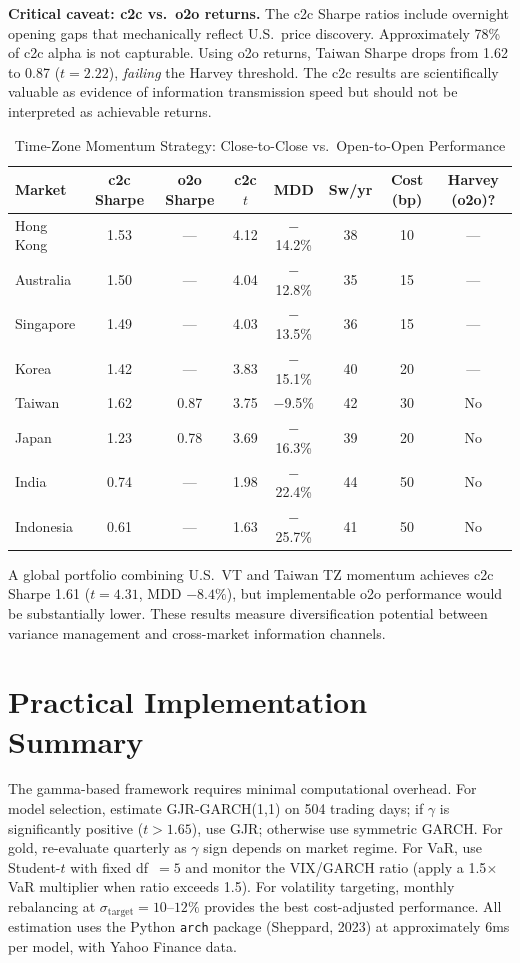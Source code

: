 \textbf{Critical caveat: c2c vs.\ o2o returns.} The c2c Sharpe ratios include overnight opening gaps that mechanically reflect U.S.\ price discovery. Approximately 78\% of c2c alpha is not capturable. Using o2o returns, Taiwan Sharpe drops from 1.62 to 0.87 ($t = 2.22$), \textit{failing} the Harvey threshold. The c2c results are scientifically valuable as evidence of information transmission speed but should not be interpreted as achievable returns.

\begin{table}[H]
\centering
\caption{Time-Zone Momentum Strategy: Close-to-Close vs.\ Open-to-Open Performance}
\label{tab:tz_arbitrage}
\small
\begin{tabular}{lccccccc}
\hline
Market & c2c Sharpe & o2o Sharpe & c2c $t$ & MDD & Sw/yr & Cost (bp) & Harvey (o2o)? \\
\hline
Hong Kong  & 1.53 & --- & 4.12 & $-$14.2\% & 38 & 10 & --- \\
Australia  & 1.50 & --- & 4.04 & $-$12.8\% & 35 & 15 & --- \\
Singapore  & 1.49 & --- & 4.03 & $-$13.5\% & 36 & 15 & --- \\
Korea      & 1.42 & --- & 3.83 & $-$15.1\% & 40 & 20 & --- \\
Taiwan     & 1.62 & 0.87 & 3.75 & $-$9.5\%  & 42 & 30 & No \\
Japan      & 1.23 & 0.78 & 3.69 & $-$16.3\% & 39 & 20 & No \\
\hline
India      & 0.74 & --- & 1.98 & $-$22.4\% & 44 & 50 & No \\
Indonesia  & 0.61 & --- & 1.63 & $-$25.7\% & 41 & 50 & No \\
\hline
\end{tabular}
\end{table}

A global portfolio combining U.S.\ VT and Taiwan TZ momentum achieves c2c Sharpe 1.61 ($t = 4.31$, MDD $-8.4\%$), but implementable o2o performance would be substantially lower. These results measure diversification potential between variance management and cross-market information channels.


\section{Practical Implementation Summary}

The gamma-based framework requires minimal computational overhead. For model selection, estimate GJR-GARCH(1,1) on 504 trading days; if $\gamma$ is significantly positive ($t > 1.65$), use GJR; otherwise use symmetric GARCH. For gold, re-evaluate quarterly as $\gamma$ sign depends on market regime. For VaR, use Student-$t$ with fixed df~$= 5$ and monitor the VIX/GARCH ratio (apply a 1.5$\times$ VaR multiplier when ratio exceeds 1.5). For volatility targeting, monthly rebalancing at $\sigma_{\text{target}} = 10\text{--}12\%$ provides the best cost-adjusted performance. All estimation uses the Python \texttt{arch} package (Sheppard, 2023) at approximately 6ms per model, with Yahoo Finance data.